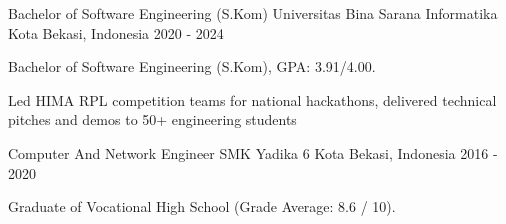 


\begin{cventries}

\cventry
    {Bachelor of Software Engineering (S.Kom)} %
    {Universitas Bina Sarana Informatika} %
    {Kota Bekasi, Indonesia} %
    {2020 - 2024} %
    {
      \begin{cvitems} %
        \item {Bachelor of Software Engineering (S.Kom), GPA: 3.91/4.00.}
        \item {Led HIMA RPL competition teams for national hackathons, delivered technical pitches and demos to 50+ engineering students}
      \end{cvitems}
    }

\cventry
    {Computer And Network Engineer} %
    {SMK Yadika 6} %
    {Kota Bekasi, Indonesia} %
    {2016 - 2020} %
    {
      \begin{cvitems} %
        \item {Graduate of Vocational High School (Grade Average: 8.6 / 10).}
      \end{cvitems}
    }
\end{cventries}
